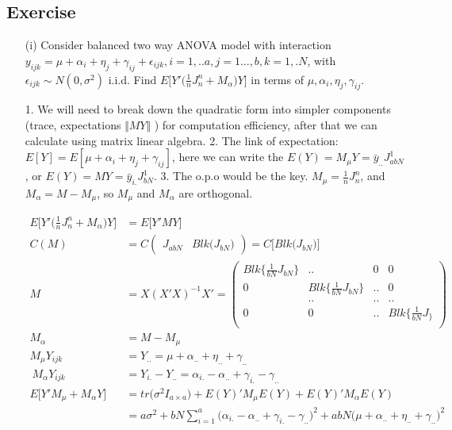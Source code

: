 \subsection{Exercise}

\begin{itemize}

\item[(i)] Consider balanced two way ANOVA model with interaction $y_{ijk} = \mu + \alpha_i + \eta_j + \gamma_{ij} + \epsilon_{ijk}, i=1,..a, j=1…, b, k=1,.N$, with $\epsilon_{ijk} \sim N(0, \sigma^2)$ i.i.d. 
Find $E \Big[ Y' \Big(\frac{1}{n} J_n^n + M_{\alpha} \Big) Y \Big]$ in terms of $\mu, \alpha_i, \eta_j, \gamma_{ij}$.

1. We will need to break down the quadratic form into simpler components (trace, expectations $\Vert M Y \Vert$ ) for computation efficiency, after that we can calculate using matrix linear algebra.
2. The link of expectation: $E[Y] = E[\mu + \alpha_i + \eta_j + \gamma_{ij} ] $, here we can write the $E(Y) = M_{\mu} Y = \bar{y}_{..} J_{abN}^1$, or  $E(Y) = M Y = \bar{y}_{i.} J_{bN}^1$. 
3. The o.p.o would be the key. $M_{\mu} = \frac{1}{n} J_n^n$, and $M_{\alpha} = M - M_{\mu}$, so $M_{\mu}$ and $M_{\alpha}$ are orthogonal. 

 \begin{align*}
    E \Big[ Y' \Big(\frac{1}{n} J_n^n + M_{\alpha} \Big) Y \Big] &= E \Big[ Y' M Y \Big] \\
    C(M) &= C \begin{pmatrix} 
    J_{abN} &Blk \Big( J_{bN} \Big)
    \end{pmatrix}  = C \Big[ Blk \Big( J_{bN} \Big) \Big]\\
    M &= X (X'X)^{-1} X' = \begin{pmatrix} 
    Blk \{ \frac{1}{bN} J_{bN} \} & .. & 0 & 0 \\
    0 & Blk \{ \frac{1}{bN} J_{bN} \} &..& 0 \\
    &..&..&.. \\
    0 & 0 & .. & Blk \{ \frac{1}{bN} J_ \}  \\
    \end{pmatrix} \\
    M_{\alpha} &= M - M_{\mu} \\
    M_{\mu} Y_{ijk} &= Y_{..}  =\mu + \alpha_{..} + \eta_{..} + \gamma_{..} \\\
    M_{\alpha} Y_{ijk} &= Y_{i.} - Y_{..} = \alpha_{i.} - \alpha_{..} + \gamma_{i.} - \gamma_{..}\\
    E \Big[ Y' M_{\mu} + M_{\alpha} Y \Big] &= tr \Big( \sigma^2 I_{a \times a} \Big) + E(Y)' M_{\mu} E(Y) +  E(Y)' M_{\alpha} E(Y)\\
    &= a \sigma^2 + bN \sum_{i=1}^a \Big(\alpha_{i.} - \alpha_{..} + \gamma_{i.} - \gamma_{..} \Big)^2 + abN \Big( \mu + \alpha_{..} + \eta_{..} + \gamma_{..}  \Big)^2 
\end{align*}

\end{itemize}

 